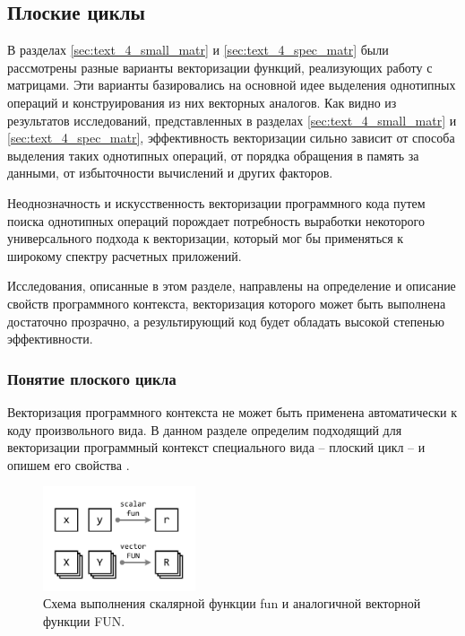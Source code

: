 \subsection{Плоские циклы}

В разделах \ref{sec:text_4_small_matr} и \ref{sec:text_4_spec_matr} были рассмотрены разные варианты векторизации функций, реализующих работу с матрицами.
Эти варианты базировались на основной идее выделения однотипных операций и конструирования из них векторных аналогов.
Как видно из результатов исследований, представленных в разделах \ref{sec:text_4_small_matr} и \ref{sec:text_4_spec_matr}, эффективность векторизации сильно зависит от способа выделения таких однотипных операций, от порядка обращения в память за данными, от избыточности вычислений и других факторов.

Неоднозначность и искусственность векторизации программного кода путем поиска однотипных операций порождает потребность выработки некоторого универсального подхода к векторизации, который мог бы применяться к широкому спектру расчетных приложений.

Исследования, описанные в этом разделе, направлены на определение и описание свойств программного контекста, векторизация которого может быть выполнена достаточно прозрачно, а результирующий код будет обладать высокой степенью эффективности.

\subsubsection{Понятие плоского цикла}

Векторизация программного контекста не может быть применена автоматически к коду произвольного вида.
В данном разделе определим подходящий для векторизации программный контекст специального вида -- плоский цикл -- и опишем его свойства \cite{Shabanov2021VecCFG}.

\begin{figure}[ht]
\centering
\includegraphics[width=0.4\textwidth]{./pics/text_4_flat/fun.pdf}
\singlespacing
{}\caption{Схема выполнения скалярной функции fun и аналогичной векторной функции FUN.}
\label{fig:text_4_vec_flat_fun_FUN}
\end{figure}

